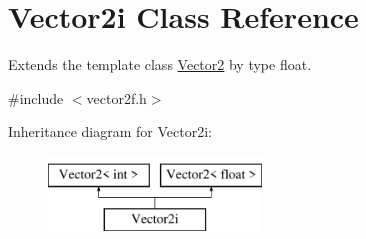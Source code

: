 \hypertarget{class_vector2i}{}\section{Vector2i Class Reference}
\label{class_vector2i}


Extends the template class \mbox{\hyperlink{class_vector2}{Vector2}} by type float.  




{\ttfamily \#include $<$vector2f.\+h$>$}

Inheritance diagram for Vector2i\+:\begin{figure}[H]
\begin{center}
\leavevmode
\includegraphics[height=2.000000cm]{class_vector2i}
\end{center}
\end{figure}
